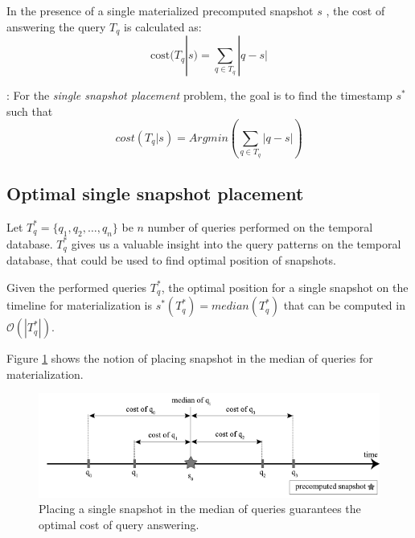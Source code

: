 		\begin{defn} 
			In the presence of a single materialized precomputed snapshot $s$ , the cost of answering the query $T_q$ is calculated as:
			$$\mathrm{cost}(T_q | s) = \sum_{q\in T_q} |q - s|$$
		\label{defn:cost_of_query_answering}
		\end{defn}

		\begin{defn}: 
		    For the \emph{single snapshot placement} problem, the goal is to find the timestamp $s^*$ such that 
			$$cost(T_q|s)= Arg min(\sum_{q\in T_q}|q - s|)$$
		\label{defn:optimal_snapshot_placement}
		\end{defn}

	\subsection{Optimal single snapshot placement} \label{sec:optimal_single_snapshot}
		 Let $T_q^* = \{q_1,q_2, \dots , q_n\}$ be $n$ number of queries performed on the temporal database. $T_q^*$ gives us a valuable insight into the query patterns on the temporal database, that could be used to find optimal position of snapshots.

		\begin{prop}
			Given the performed queries $T_q^*$, the optimal position for a single snapshot on the timeline for materialization is $s^*(T_q^*)=median(T_q^*)$ that can be computed in $\mathcal{O}(|T_q^*|)$. 
		\label{prop:compute-median}
		\end{prop}
		    
		Figure \ref{fig:optimal_materialization} shows the notion of placing snapshot in the median of queries for materialization.

		\begin{figure}
			\centering
			\includegraphics[width=\textwidth]{figs/optimal_materialization.pdf}
			\caption{Placing a single snapshot in the median of queries guarantees the optimal cost of query answering.}
			\label{fig:optimal_materialization}
		\end{figure}


